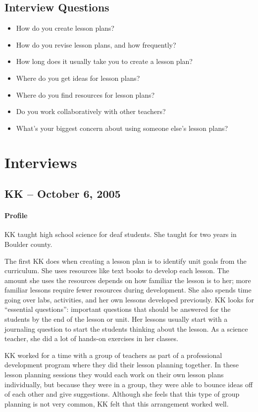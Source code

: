 \documentclass[12pt,titlepage]{article}
\begin{document}
\subsection{Interview Questions}
\begin{itemize}
	\item How do you create lesson plans?
	\item How do you revise lesson plans, and how frequently?
	\item How long does it usually take you to create a lesson plan?
	\item Where do you get ideas for lesson plans?
	\item Where do you find resources for lesson plans?
	\item Do you work collaboratively with other teachers?
	\item What's your biggest concern about using someone else's lesson plans?
\end{itemize}

\section{Interviews}
\subsection{KK -- October 6, 2005}
\paragraph{Profile} KK taught high school science for deaf students. She taught
for two years in Boulder county.

The first KK does when creating a lesson plan is to identify unit goals from the
curriculum. She uses resources like text books to develop each lesson. The
amount she uses the resources depends on how familiar the lesson is to her; more
familiar lessons require fewer resources during development. She also spends
time going over labs, activities, and her own lessons developed previously. KK
looks for ``essential questions'': important questions that should be answered
for the students by the end of the lesson or unit. Her lessons usually start
with a journaling question to start the students thinking about the lesson. As
a science teacher, she did a lot of hands-on exercises in her classes.

KK worked for a time with a group of teachers as part of a professional
development program where they did their lesson planning together. In these
lesson planning sessions they would each work on their own lesson plans
individually, but because they were in a group, they were able to bounce ideas
off of each other and give suggestions. Although she feels that this type of
group planning is not very common, KK felt that this arrangement worked
well.
\end{document}

